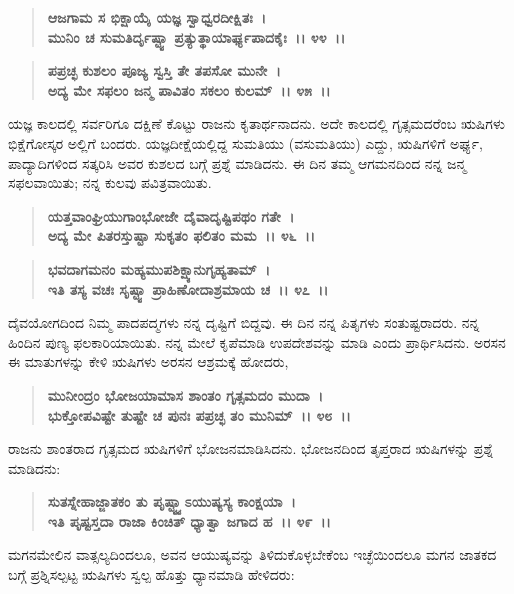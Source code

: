 \begin{verse}
\textbf{ಆಜಗಾಮ ಸ ಭಿಕ್ಷಾಯೈ ಯಜ್ಞ ಸ್ವಾಧ್ವರದೀಕ್ಷಿತಃ~।}\\\textbf{ಮುನಿಂ ಚ ಸುಮತಿರ್ದೃಷ್ಟ್ವಾ ಪ್ರತ್ಯುತ್ಥಾಯಾರ್ಘ್ಯಪಾದಕೈಃ~।। ೪೪~।। }
\end{verse}

\begin{verse}
\textbf{ಪಪ್ರಚ್ಛ ಕುಶಲಂ ಪೂಜ್ಯ ಸ್ವಸ್ತಿ ತೇ ತಪಸೋ ಮುನೇ~।}\\\textbf{ಅದ್ಯ ಮೇ ಸಫಲಂ ಜನ್ಮ ಪಾವಿತಂ ಸಕಲಂ ಕುಲಮ್~।। ೪೫~।।}
\end{verse}

ಯಜ್ಞ ಕಾಲದಲ್ಲಿ ಸರ್ವರಿಗೂ ದಕ್ಷಿಣೆ ಕೊಟ್ಟು ರಾಜನು ಕೃತಾರ್ಥನಾದನು. ಅದೇ ಕಾಲದಲ್ಲಿ ಗೃತ್ಸಮದರೆಂಬ ಋಷಿಗಳು ಭಿಕ್ಷೆಗೋಸ್ಕರ ಅಲ್ಲಿಗೆ ಬಂದರು. ಯಜ್ಞದೀಕ್ಷೆಯಲ್ಲಿದ್ದ ಸುಮತಿಯು (ವಸುಮತಿಯು) ಎದ್ದು, ಋಷಿಗಳಿಗೆ ಅರ್ಘ್ಯ, ಪಾದ್ಯಾದಿಗಳಿಂದ ಸತ್ಕರಿಸಿ ಅವರ ಕುಶಲದ ಬಗ್ಗೆ ಪ್ರಶ್ನೆ ಮಾಡಿದನು. ಈ ದಿನ ತಮ್ಮ ಆಗಮನದಿಂದ ನನ್ನ ಜನ್ಮ ಸಫಲವಾಯಿತು; ನನ್ನ ಕುಲವು ಪವಿತ್ರವಾಯಿತು.

\begin{verse}
\textbf{ಯತ್ತವಾಂಘ್ರಿಯುಗಾಂಭೋಜೇ ದೈವಾದೃಷ್ಟಿಪಥಂ ಗತೇ~।}\\\textbf{ಅದ್ಯ ಮೇ ಪಿತರಸ್ತುಷ್ಟಾ ಸುಕೃತಂ ಫಲಿತಂ ಮಮ~।। ೪೬~।। }
\end{verse}

\begin{verse}
\textbf{ಭವದಾಗಮನಂ ಮಹ್ಯಮುಪಶಿಕ್ಷ್ಯಾನುಗೃಹ್ಯತಾಮ್~।}\\\textbf{ಇತಿ ತಸ್ಯ ವಚಃ ಸೃಷ್ಟ್ವಾ ಪ್ರಾಹಿಣೋದಾಶ್ರಮಾಯ ಚ~।। ೪೭~।।}
\end{verse}

ದೈವಯೋಗದಿಂದ ನಿಮ್ಮ ಪಾದಪದ್ಮಗಳು ನನ್ನ ದೃಷ್ಟಿಗೆ ಬಿದ್ದವು. ಈ ದಿನ ನನ್ನ ಪಿತೃಗಳು ಸಂತುಷ್ಟರಾದರು. ನನ್ನ ಹಿಂದಿನ ಪುಣ್ಯ ಫಲಕಾರಿಯಾಯಿತು. ನನ್ನ ಮೇಲೆ ಕೃಪೆಮಾಡಿ ಉಪದೇಶವನ್ನು ಮಾಡಿ ಎಂದು ಪ್ರಾರ್ಥಿಸಿದನು. ಅರಸನ ಈ ಮಾತುಗಳನ್ನು ಕೇಳಿ ಋಷಿಗಳು ಅರಸನ ಆಶ್ರಮಕ್ಕೆ ಹೋದರು,

\begin{verse}
\textbf{ಮುನೀಂದ್ರಂ ಭೋಜಯಾಮಾಸ ಶಾಂತಂ ಗೃತ್ಸಮದಂ ಮುದಾ~।}\\\textbf{ಭುಕ್ತೋಪವಿಷ್ಟೇ ತುಷ್ಟೇ ಚ ಪುನಃ ಪಪ್ರಚ್ಛ ತಂ ಮುನಿಮ್~।। ೪೮~।।}
\end{verse}

ರಾಜನು ಶಾಂತರಾದ ಗೃತ್ಸಮದ ಋಷಿಗಳಿಗೆ ಭೋಜನಮಾಡಿಸಿದನು. ಭೋಜನದಿಂದ ತೃಪ್ತರಾದ ಋಷಿಗಳನ್ನು ಪ್ರಶ್ನೆ ಮಾಡಿದನು:

\begin{verse}
\textbf{ಸುತಸ್ನೇಹಾಜ್ಜಾತಕಂ ತು ಪೃಷ್ಟ್ವ್ವಾಽಯುಷ್ಯಸ್ಯ ಕಾಂಕ್ಷಯಾ~।}\\\textbf{ಇತಿ ಪೃಷ್ಟಸ್ತದಾ ರಾಜಾ ಕಿಂಚಿತ್ ಧ್ಯಾತ್ವಾ ಜಗಾದ ಹ~।। ೪೯~।।}
\end{verse}

ಮಗನಮೇಲಿನ ವಾತ್ಸಲ್ಯದಿಂದಲೂ, ಅವನ ಆಯುಷ್ಯವನ್ನು ತಿಳಿದುಕೊಳ್ಳಬೇಕೆಂಬ ಇಚ್ಛೆಯಿಂದಲೂ ಮಗನ ಜಾತಕದ ಬಗ್ಗೆ ಪ್ರಶ್ನಿಸಲ್ಪಟ್ಟ ಋಷಿಗಳು ಸ್ವಲ್ಪ ಹೊತ್ತು ಧ್ಯಾನಮಾಡಿ ಹೇಳಿದರು:


